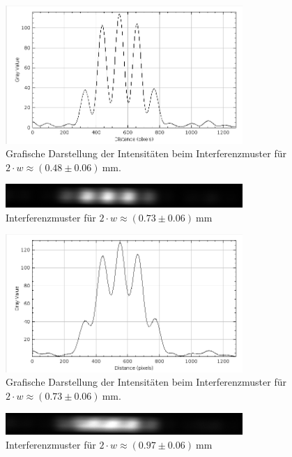 \documentclass{article}
\begin{document}
\begin{figure}[H]
\centering
\caption{Grafische Darstellung der Intensitäten beim Interferenzmuster für $2\cdot w \approx (0.48\pm0.06)~$mm.}
\includegraphics[width=9cm]{moodle/img3_graph.png}
\end{figure}



\begin{figure}[H]
\centering
\caption{Interferenzmuster für $2\cdot w \approx (0.73\pm0.06)~$mm}
\includegraphics[width=9cm]{moodle/img4.png}
\end{figure}

\begin{figure}[H]
\centering
\caption{Grafische Darstellung der Intensitäten beim Interferenzmuster für $2\cdot w \approx (0.73\pm0.06)~$mm.}
\includegraphics[width=9cm]{moodle/img4_graph.png}
\end{figure}




\begin{figure}[H]
\centering
\caption{Interferenzmuster für $2\cdot w \approx (0.97\pm0.06)~$mm}
\includegraphics[width=9cm]{moodle/img5.png}
\end{figure}
\end{document}
